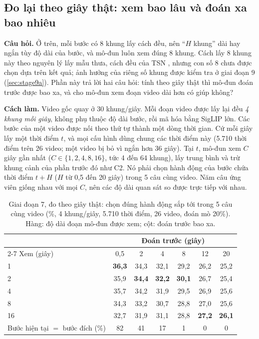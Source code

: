 \documentclass[a4paper,oneside]{report}
\begin{document}
\subsection{Đo lại theo giây thật: xem bao lâu và đoán xa bao nhiêu}
\label{sec:stage7_seconds}

\textbf{Câu hỏi.} Ở trên, mỗi bước có 8 khung lấy cách đều, nên ``$H$ khung'' dài hay ngắn tùy độ dài của bước, và mô-đun luôn xem đúng 8 khung. Cách lấy 8 khung này theo nguyên lý lấy mẫu thưa, cách đều của TSN \citep{wang2016tsn}, nhưng con số 8 chưa được chọn dựa trên kết quả; ảnh hưởng của riêng số khung được kiểm tra ở giai đoạn 9 (\cref{sec:stage9a}). Phần này trả lời hai câu hỏi: tính theo giây thật thì mô-đun đoán trước được bao xa, và cho mô-đun xem đoạn video dài hơn có giúp không?

\textbf{Cách làm.} Video gốc quay ở 30 khung/giây. Mỗi đoạn video được lấy lại đều \textit{4 khung mỗi giây}, không phụ thuộc độ dài bước, rồi mã hóa bằng SigLIP lớn. Các bước của một video được nối theo thứ tự thành một dòng thời gian. Cứ mỗi giây lấy một thời điểm $t$, và mọi cấu hình dùng chung các thời điểm này (5.710 thời điểm trên 26 video; một video bị bỏ vì ngắn hơn 36 giây). Tại $t$, mô-đun xem $C$ giây gần nhất ($C\in\{1,2,4,8,16\}$, tức 4 đến 64 khung), lấy trung bình và trừ khung cảnh của phần trước đó như C2. Nó phải chọn hành động của bước chứa thời điểm $t+H$ ($H$ từ 0,5 đến 20 giây) trong 5 câu cùng video. Năm câu ứng viên giống nhau với mọi $C$, nên các độ dài quan sát so được trực tiếp với nhau.

\begin{table}[ht]
\centering
\caption{Giai đoạn 7, đo theo giây thật: chọn đúng hành động sắp tới trong 5 câu cùng video (\%, 4 khung/giây, 5.710 thời điểm, 26 video, đoán mò 20\%). Hàng: độ dài đoạn mô-đun được xem; cột: đoán trước bao xa.}
\label{tab:time_horizon}
\small
\begin{tabular}{lcccccc}
\toprule
& \multicolumn{6}{c}{Đoán trước (giây)} \\
\cmidrule(lr){2-7}
Xem (giây) & 0,5 & 2 & 4 & 8 & 12 & 20 \\
\midrule
1  & \textbf{36,3} & 34,3 & 32,1 & 29,2 & 26,2 & 25,2 \\
2  & 35,9 & \textbf{34,4} & \textbf{32,2} & \textbf{30,1} & 26,7 & 25,4 \\
4  & 35,7 & 34,2 & 31,9 & 29,5 & 26,9 & 25,6 \\
8  & 34,3 & 33,2 & 30,7 & 28,8 & 27,0 & 25,6 \\
16 & 32,7 & 31,9 & 31,1 & 28,8 & \textbf{27,2} & \textbf{26,1} \\
\midrule
Bước hiện tại $=$ bước đích (\%) & 82 & 41 & 17 & 1 & 0 & 0 \\
\bottomrule
\end{tabular}
\end{table}
\end{document}
